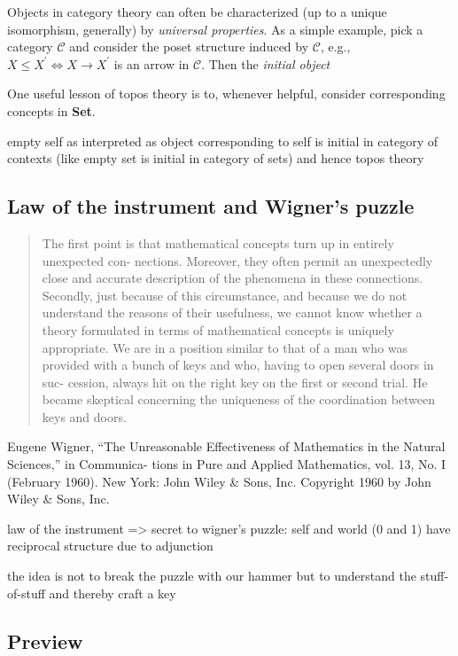 \documentclass{article}
\begin{document}
Objects in category theory can often be characterized (up to a unique isomorphism, generally) by \emph{universal properties}. As a simple example, pick a category $\mathcal{C}$ and consider the poset structure induced by $\mathcal{C}$, e.g., $X \leq X^{\prime} \iff X \to X^{\prime}$ is an arrow in $\mathcal{C}$. Then the \emph{initial object}

One useful lesson of topos theory is to, whenever helpful, consider corresponding concepts in \textbf{Set}.

empty self as interpreted as object corresponding to self is initial in category of contexts (like empty set is initial in category of sets) and hence topos theory


\subsection{Law of the instrument and Wigner's puzzle}
\begin{quotation}
    The first point is that mathematical concepts turn up in entirely unexpected con- nections. Moreover, they often permit an unexpectedly close and accurate description of the phenomena in these connections. Secondly, just because of this circumstance, and because we do not understand the reasons of their usefulness, we cannot know whether a theory formulated in terms of mathematical concepts is uniquely appropriate. We are in a position similar to that of a man who was provided with a bunch of keys and who, having to open several doors in suc- cession, always hit on the right key on the first or second trial. He became skeptical concerning the uniqueness of the coordination between keys and doors.
\end{quotation}

Eugene Wigner, “The Unreasonable Effectiveness of Mathematics in the Natural Sciences,” in Communica- tions in Pure and Applied Mathematics, vol. 13, No. I (February 1960). New York: John Wiley \& Sons, Inc. Copyright 1960 by John Wiley \& Sons, Inc.

law of the instrument => secret to wigner's puzzle: self and world (0 and 1) have reciprocal structure due to adjunction

the idea is not to break the puzzle with our hammer but to understand the stuff-of-stuff and thereby craft a key

\subsection{Preview}
\end{document}
